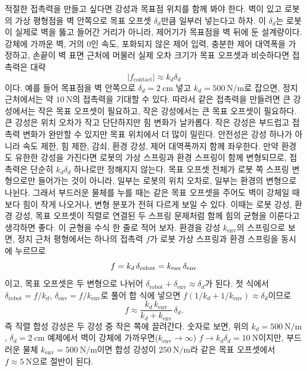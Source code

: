 적절한 접촉력을 만들고 싶다면 강성과 목표점 위치를 함께 봐야 한다.
벽이 있고 로봇의 가상 평형점을 벽 안쪽으로 목표 오프셋 $\delta_d$만큼 일부러 넣는다고 하자.
이 $\delta_d$는 로봇이 실제로 벽을 뚫고 들어간 거리가 아니라, 제어기가 목표점을 벽 뒤에 둔 설계량이다.
강체에 가까운 벽, 거의 0인 속도, 포화되지 않은 제어 입력, 충분한 제어 대역폭을 가정하고, 손끝이 벽 표면 근처에 머물러 실제 오차 크기가 목표 오프셋과 비슷하다면 접촉력은 대략
\begin{equation}
  |f_{\mathrm{contact}}|\approx k_d\delta_d
\end{equation}
이다.
예를 들어 목표점을 벽 안쪽으로 $\delta_d=2~\mathrm{cm}$ 넣고 $k_d=500~\mathrm{N/m}$로 잡으면, 정지 근처에서는 약 $10~\mathrm{N}$의 접촉력을 기대할 수 있다.
따라서 같은 접촉력을 만들려면 큰 강성에서는 작은 목표 오프셋이 필요하고, 작은 강성에서는 큰 목표 오프셋이 필요하다.
큰 강성은 위치 오차가 작고 단단하지만 힘 변화가 날카롭다.
작은 강성은 부드럽고 접촉력 변화가 완만할 수 있지만 목표 위치에서 더 많이 밀린다.
안전성은 강성 하나가 아니라 속도 제한, 힘 제한, 감쇠, 환경 강성, 제어 대역폭까지 함께 좌우한다.
만약 환경도 유한한 강성을 가진다면 로봇의 가상 스프링과 환경 스프링이 함께 변형되므로, 접촉력은 단순히 $k_d\delta_d$ 하나로만 정해지지 않는다.
목표 오프셋 전체가 로봇 쪽 스프링 변형으로만 들어가는 것이 아니라, 일부는 로봇의 위치 오차로, 일부는 환경의 변형으로 나뉜다.
그래서 부드러운 물체를 누를 때는 같은 목표 오프셋을 주어도 벽이 강체일 때보다 힘이 작게 나오거나, 변형 분포가 전혀 다르게 보일 수 있다.
이때는 로봇 강성, 환경 강성, 목표 오프셋이 직렬로 연결된 두 스프링 문제처럼 함께 힘의 균형을 이룬다고 생각하면 좋다.
이 균형을 수식 한 줄로 적어 보자.
환경을 강성 $k_{\mathrm{env}}$의 스프링으로 보면, 정지 근처 평형에서는 하나의 접촉력 $f$가 로봇 가상 스프링과 환경 스프링을 동시에 누르므로
\[
  f
  =
  k_d\,\delta_{\mathrm{robot}}
  =
  k_{\mathrm{env}}\,\delta_{\mathrm{env}}
\vmark{contact-series-stiffness-split}%
\]
이고, 목표 오프셋은 두 변형으로 나뉘어 $\delta_{\mathrm{robot}}+\delta_{\mathrm{env}}\approx\delta_d$가 된다.
첫 식에서 $\delta_{\mathrm{robot}}=f/k_d$, $\delta_{\mathrm{env}}=f/k_{\mathrm{env}}$로 풀어 합 식에 넣으면 $f(1/k_d+1/k_{\mathrm{env}})\approx\delta_d$이므로
\[
  f
  \approx
  \frac{k_d\,k_{\mathrm{env}}}{k_d+k_{\mathrm{env}}}\,\delta_d.
\]
즉 직렬 합성 강성은 두 강성 중 작은 쪽에 끌려간다.
숫자로 보면, 위의 $k_d=500~\mathrm{N/m}$, $\delta_d=2~\mathrm{cm}$ 예제에서 벽이 강체에 가까우면($k_{\mathrm{env}}\to\infty$) $f\to k_d\delta_d=10~\mathrm{N}$이지만, 부드러운 물체 $k_{\mathrm{env}}=500~\mathrm{N/m}$이면 합성 강성이 $250~\mathrm{N/m}$라 같은 목표 오프셋에서 $f\approx5~\mathrm{N}$으로 절반이 된다.
%

